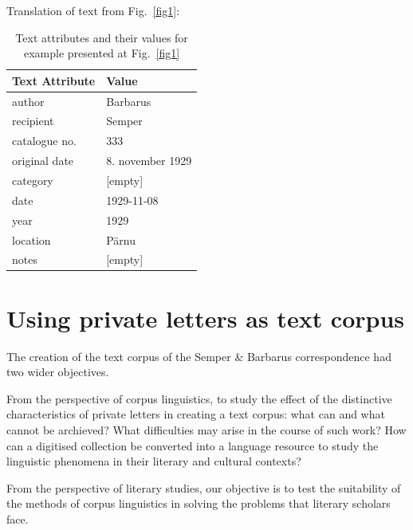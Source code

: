\documentclass[runningheads]{llncs}
\begin{document}
Translation of text from Fig.~\ref{fig1}:


\begin{table}
  \caption{Text attributes and their values for example presented at Fig.~\ref{fig1}}
  \label{tabattrs}
\begin{tabular}{|l | l |}
  \hline
  Text Attribute & Value \\
  \hline

author & Barbarus\\
recipient & Semper\\
catalogue no. & 333\\
original date & 8. november 1929\\
category & [empty]\\
date & 1929-11-08\\
year & 1929\\
location & Pärnu\\
notes & [empty]\\
\hline
\end{tabular}
\end{table}


\section{Using private letters as text corpus}

The creation of the text corpus of the Semper \& Barbarus correspondence had two wider objectives.  

From the perspective of corpus linguistics, to study the effect of the distinctive characteristics of private letters in creating a text corpus: what can and what cannot be archieved? What difficulties may arise in the course of such work? How can a digitised collection be converted into a language resource  to study the linguistic phenomena in their literary and cultural contexts?

From the perspective of literary studies, our objective is to test the suitability of the methods of corpus linguistics in solving the problems that literary scholars face.
\end{document}

